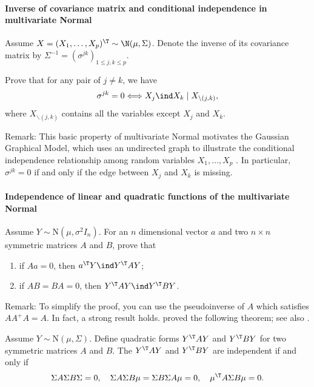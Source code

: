 \paragraph{Inverse of covariance matrix and conditional independence in multivariate Normal}\label{hwmath2::inverse-cov-conind-normal}


Assume $X = (X_1, \ldots, X_p)^{\T} \sim \N(\mu, \Sigma)$. Denote the inverse of its covariance matrix by $\Sigma^{-1}  = (\sigma^{jk})_{1\leq j, k\leq p}$. 

Prove that for any pair of $j \neq k$, we have 
$$
\sigma^{jk} = 0 \Longleftrightarrow  X_j \ind X_k \mid X_{\backslash (j,k)} , 
$$
where $X_{\backslash (j,k)}$ contains all the variables except $X_j$ and $X_k$. 


Remark: This basic property of multivariate Normal motivates the Gaussian Graphical Model, which uses an undirected graph to illustrate the conditional independence relationship among random variables $X_1, \ldots, X_p$ \citep{dempster1972covariance}. In particular, $\sigma^{jk} = 0 $ if and only if the edge between $X_j$ and $X_k$ is missing. 


\paragraph{Independence of linear and quadratic functions of the multivariate Normal}\label{hw00math2::independence-linear-quadratic}

Assume $Y\sim\text{N}(\mu,\sigma^{2}I_{n})$. For an $n$ dimensional
vector $a$ and two $n\times n$ symmetric matrices $A$ and $B$, prove that
\begin{enumerate}
\item if $ Aa =0$, then $a^{\T}Y\ind Y^{\T}AY$;
\item if $AB=BA=0$, then $Y^{\T}AY\ind Y^{\T}BY$.
\end{enumerate}


Remark: To simplify the proof, you can use the pseudoinverse of $A$ which satisfies $AA^{+}A=A$.
In fact, a strong result holds. \citet{ogasawara1951independence} proved the following theorem; see also \citet[][Theorem 5]{styan1970notes}.

\begin{theorem}
Assume $Y\sim\text{N}(\mu,\Sigma )$. Define quadratic forms $Y^{\T}AY$ and $ Y^{\T}BY$ for two symmetric matrices $A$ and $B$. The $Y^{\T}AY$ and $ Y^{\T}BY$ are independent if and only if 
$$
\Sigma A \Sigma B \Sigma = 0,\quad
\Sigma A \Sigma B \mu = \Sigma B \Sigma A \mu = 0,\quad
\mu^{\T} A \Sigma B \mu = 0.
$$
\end{theorem}







